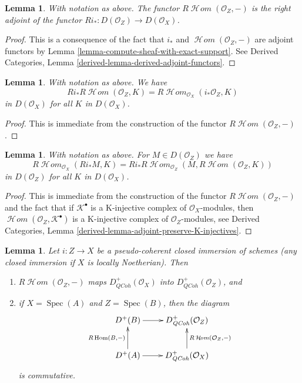 \documentclass{stacks-project}
\theoremstyle{plain}
\newtheorem{lemma}[subsection]{Lemma}
\theoremstyle{definition}
\theoremstyle{remark}
\numberwithin{equation}{subsection}
\def\Spec{\mathop{\mathrm{Spec}}}
\def\Hom{\mathop{\mathrm{Hom}}\nolimits}
\def\SheafHom{\mathop{\mathcal{H}\!\mathit{om}}\nolimits}
\def\QCoh{\mathit{QCoh}}
\begin{document}
\begin{lemma}
\label{lemma-sheaf-with-exact-support-adjoint}
With notation as above. The functor $R\SheafHom(\mathcal{O}_Z, -)$
is the right adjoint of the functor
$Ri_* : D(\mathcal{O}_Z) \to D(\mathcal{O}_X)$.
\end{lemma}

\begin{proof}
This is a consequence of the fact that $i_*$ and
$\SheafHom(\mathcal{O}_Z, -)$ are adjoint functors by
Lemma \ref{lemma-compute-sheaf-with-exact-support}. See
Derived Categories, Lemma \ref{derived-lemma-derived-adjoint-functors}.
\end{proof}

\begin{lemma}
\label{lemma-sheaf-with-exact-support-ext}
With notation as above. We have
$$
Ri_*R\SheafHom(\mathcal{O}_Z, K) =
R\SheafHom_{\mathcal{O}_X}(i_*\mathcal{O}_Z, K)
$$
in $D(\mathcal{O}_X)$ for all $K$ in $D(\mathcal{O}_X)$.
\end{lemma}

\begin{proof}
This is immediate from the construction of the functor
$R\SheafHom(\mathcal{O}_Z, -)$.
\end{proof}

\begin{lemma}
\label{lemma-sheaf-with-exact-support-internal-home}
With notation as above. For $M \in D(\mathcal{O}_Z)$ we have
$$
R\SheafHom_{\mathcal{O}_X}(Ri_*M, K) =
Ri_*R\SheafHom_{\mathcal{O}_Z}(M, R\SheafHom(\mathcal{O}_Z, K))
$$
in $D(\mathcal{O}_Z)$ for all $K$ in $D(\mathcal{O}_X)$.
\end{lemma}

\begin{proof}
This is immediate from the construction of the functor
$R\SheafHom(\mathcal{O}_Z, -)$ and the fact that if
$\mathcal{K}^\bullet$ is a K-injective complex of
$\mathcal{O}_X$-modules, then $\SheafHom(\mathcal{O}_Z, \mathcal{K}^\bullet)$
is a K-injective complex of $\mathcal{O}_Z$-modules, see
Derived Categories, Lemma \ref{derived-lemma-adjoint-preserve-K-injectives}.
\end{proof}

\begin{lemma}
\label{lemma-sheaf-with-exact-support-quasi-coherent}
Let $i : Z \to X$ be a pseudo-coherent closed immersion of schemes
(any closed immersion if $X$ is locally Noetherian).
Then
\begin{enumerate}
\item $R\SheafHom(\mathcal{O}_Z, -)$ maps $D^+_\QCoh(\mathcal{O}_X)$
into $D^+_\QCoh(\mathcal{O}_Z)$, and
\item if $X = \Spec(A)$ and $Z = \Spec(B)$, then the diagram
$$
\xymatrix{
D^+(B) \ar[r] & D_\QCoh^+(\mathcal{O}_Z) \\
D^+(A) \ar[r] \ar[u]^{R\Hom(B, -)} &
D_\QCoh^+(\mathcal{O}_X) \ar[u]_{R\SheafHom(\mathcal{O}_Z, -)}
}
$$
is commutative.
\end{enumerate}
\end{lemma}
\end{document}
